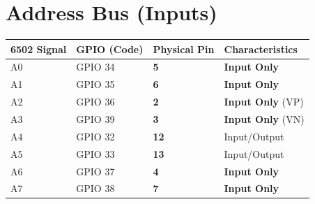 \documentclass[a4paper,10pt]{article}
\begin{document}
\section{Address Bus (Inputs)}
\begin{table}[h!]
\centering
\begin{tabular}{@{}llll@{}}
\toprule
\textbf{6502 Signal} & \textbf{GPIO (Code)} & \textbf{Physical Pin} & \textbf{Characteristics} \\ \midrule
A0                   & GPIO 34             & \textbf{5}           & \textbf{Input Only}      \\
A1                   & GPIO 35             & \textbf{6}           & \textbf{Input Only}      \\
A2                   & GPIO 36             & \textbf{2}           & \textbf{Input Only} (VP) \\
A3                   & GPIO 39             & \textbf{3}           & \textbf{Input Only} (VN) \\
A4                   & GPIO 32             & \textbf{12}          & Input/Output             \\
A5                   & GPIO 33             & \textbf{13}          & Input/Output             \\
A6                   & GPIO 37             & \textbf{4}           & \textbf{Input Only}      \\
A7                   & GPIO 38             & \textbf{7}           & \textbf{Input Only}      \\ \bottomrule
\end{tabular}
\end{table}
\end{document}
